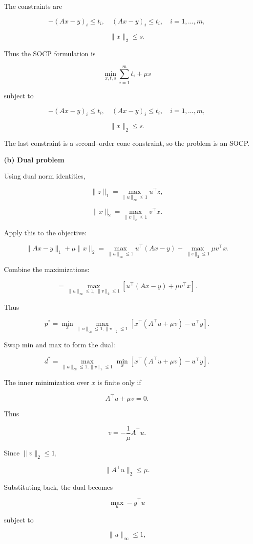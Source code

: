 \documentclass[
	12pt,
]{fphw}
\begin{document}
The constraints are

\[
-(Ax-y)_i \le t_i, \quad (Ax-y)_i \le t_i, \quad i=1,\dots,m,
\]

\[
\|x\|_2 \le s.
\]

Thus the SOCP formulation is

\[
\min_{x,t,s} \sum_{i=1}^m t_i + \mu s
\]

subject to

\[
-(Ax-y)_i \le t_i, \quad (Ax-y)_i \le t_i, \quad i=1,\dots,m,
\]

\[
\|x\|_2 \le s.
\]

The last constraint is a second–order cone constraint, so the problem is an SOCP.

\bigskip

\textbf{(b) Dual problem}

Using dual norm identities,

\[
\|z\|_1 = \max_{\|u\|_\infty \le 1} u^\top z,
\]

\[
\|x\|_2 = \max_{\|v\|_2 \le 1} v^\top x.
\]

Apply this to the objective:

\[
\|Ax-y\|_1 + \mu \|x\|_2
=
\max_{\|u\|_\infty \le 1} u^\top(Ax-y)
+
\max_{\|v\|_2 \le 1} \mu v^\top x.
\]

Combine the maximizations:

\[
=
\max_{\|u\|_\infty \le 1,\ \|v\|_2 \le 1}
\left[
u^\top(Ax-y) + \mu v^\top x
\right].
\]

Thus

\[
p^* =
\min_x
\max_{\|u\|_\infty \le 1,\|v\|_2 \le 1}
\left[
x^\top(A^\top u + \mu v) - u^\top y
\right].
\]

Swap min and max to form the dual:

\[
d^* =
\max_{\|u\|_\infty \le 1,\|v\|_2 \le 1}
\min_x
\left[
x^\top(A^\top u + \mu v) - u^\top y
\right].
\]

The inner minimization over \(x\) is finite only if

\[
A^\top u + \mu v = 0.
\]

Thus

\[
v = -\frac{1}{\mu}A^\top u.
\]

Since \(\|v\|_2 \le 1\),

\[
\|A^\top u\|_2 \le \mu.
\]

Substituting back, the dual becomes

\[
\max_{u} -y^\top u
\]

subject to

\[
\|u\|_\infty \le 1,
\]
\end{document}
